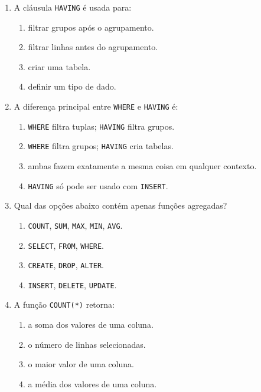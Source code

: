 \documentclass[12pt,a4paper]{article}
\begin{document}
\begin{enumerate}[label=\textbf{Q\arabic*.}]
\item A cláusula \texttt{HAVING} é usada para:

\begin{enumerate}[label=\alph*)]
    \item filtrar grupos após o agrupamento.
    \item filtrar linhas antes do agrupamento.
    \item criar uma tabela.
    \item definir um tipo de dado.
\end{enumerate}

\item A diferença principal entre \texttt{WHERE} e \texttt{HAVING} é:

\begin{enumerate}[label=\alph*)]
    \item \texttt{WHERE} filtra tuplas; \texttt{HAVING} filtra grupos.
    \item \texttt{WHERE} filtra grupos; \texttt{HAVING} cria tabelas.
    \item ambas fazem exatamente a mesma coisa em qualquer contexto.
    \item \texttt{HAVING} só pode ser usado com \texttt{INSERT}.
\end{enumerate}

\item Qual das opções abaixo contém apenas funções agregadas?

\begin{enumerate}[label=\alph*)]
    \item \texttt{COUNT}, \texttt{SUM}, \texttt{MAX}, \texttt{MIN}, \texttt{AVG}.
    \item \texttt{SELECT}, \texttt{FROM}, \texttt{WHERE}.
    \item \texttt{CREATE}, \texttt{DROP}, \texttt{ALTER}.
    \item \texttt{INSERT}, \texttt{DELETE}, \texttt{UPDATE}.
\end{enumerate}

\item A função \texttt{COUNT(*)} retorna:

\begin{enumerate}[label=\alph*)]
    \item a soma dos valores de uma coluna.
    \item o número de linhas selecionadas.
    \item o maior valor de uma coluna.
    \item a média dos valores de uma coluna.
\end{enumerate}


\end{enumerate}
\end{document}
